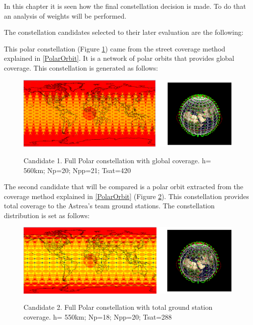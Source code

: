 In this chapter it is seen how the final constellation decision is made. To do that an analysis of weights will be performed.

The constellation candidates selected to their later evaluation are the following:

This polar constellation (Figure \ref{fig:Candidate1}) came from the street coverage method explained in \ref{PolarOrbit}. It is a network of polar orbits that provides global coverage. This constellation is generated as follows:

\begin{figure}[H] %
	\centering
	\includegraphics[width=1\textwidth]{Candidate1.png}\\
	\caption{Candidate 1. Full Polar constellation with global coverage.
			 h= 560km; Np=20; Npp=21; Tsat=420 }
	\label{fig:Candidate1}
\end{figure}

The second candidate that will be compared is a polar orbit extracted from the coverage method explained in \ref{PolarOrbit} (Figure \ref{fig:Candidate2}). This constellation provides total coverage to the Astrea's team ground stations. The constellation distribution is set as follows:

\begin{figure}[H]%
	\centering
	\includegraphics[width=1\textwidth]{Candidate2.png}\\
	\caption{Candidate 2. Full Polar constellation with total ground station coverage.
			 h= 550km; Np=18; Npp=20; Tsat=288 }
	\label{fig:Candidate2}
\end{figure}

